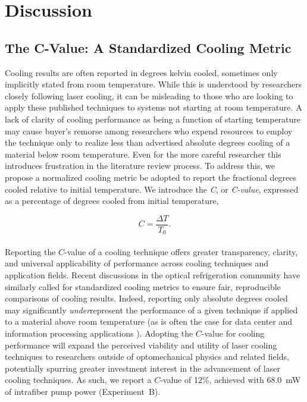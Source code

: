 
\section{Discussion}
\label{Cooling:sec:Discussion}

\subsection{The C-Value: A Standardized Cooling Metric}
\label{Cooling:subsec:StandardizedCoolingMetric}

Cooling results are often reported in degrees kelvin cooled, sometimes only implicitly stated from room temperature. While this is understood by researchers closely following laser cooling, it can be misleading to those who are looking to apply these published techniques to systems not starting at room temperature. A lack of clarity of cooling performance as being a function of starting temperature may cause buyer's remorse among researchers who expend resources to employ the technique only to realize less than advertised absolute degrees cooling of a material below room temperature. Even for the more careful researcher this introduces frustration in the literature review process. To address this, we propose a normalized cooling metric be adopted to report the fractional degrees cooled relative to initial temperature. We introduce the \emph{\ac{C}}, or \emph{C-value}, expressed as a percentage of degrees cooled from initial temperature,

\begin{equation}
  C = \frac{\Delta T}{T_{0}}.
\end{equation}
\\
Reporting the \(C\)-value of a cooling technique offers greater transparency, clarity, and universal applicability of performance across cooling techniques and application fields. Recent discussions in the optical refrigeration community have similarly called for standardized cooling metrics to ensure fair, reproducible comparisons of cooling results. \cite{zhang2024experimental} Indeed, reporting only absolute degrees cooled may significantly \emph{under}represent the performance of a given technique if applied to a material above room temperature (as is often the case for data center and information processing applications \cite{}). Adopting the \(C\)-value for cooling performance will expand the perceived viability and utility of laser cooling techniques to researchers outside of optomechanical physics and related fields, potentially spurring greater investment interest in the advancement of laser cooling techniques. As such, we report a \(C\)-value of 12\%, achieved with \SI{68.0}{\milli\watt} of intrafiber pump power (Experiment~B).

